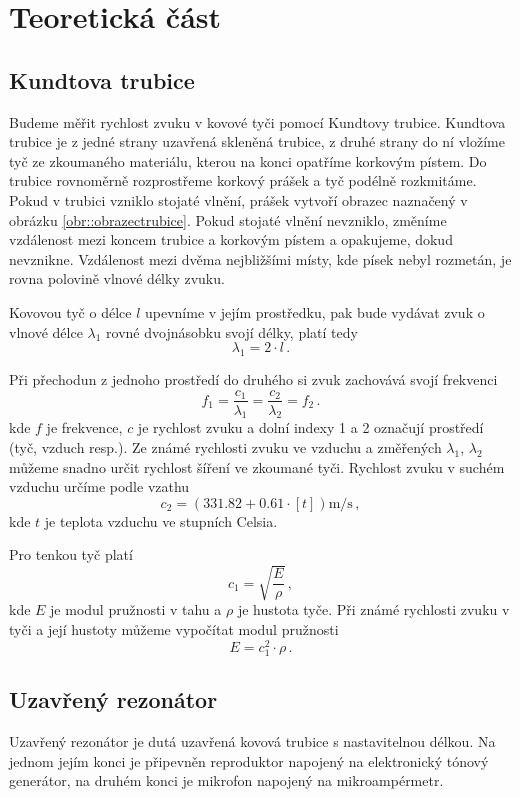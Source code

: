\section*{Teoretická část}
\subsection*{Kundtova trubice}
Budeme měřit rychlost zvuku v kovové tyči pomocí Kundtovy trubice.
Kundtova trubice je z jedné strany uzavřená skleněná trubice, z druhé strany do ní vložíme tyč ze zkoumaného materiálu, kterou na konci opatříme korkovým pístem.
Do trubice rovnoměrně rozprostřeme korkový prášek a tyč podélně rozkmitáme.
Pokud v trubici vzniklo stojaté vlnění, prášek vytvoří obrazec naznačený v obrázku \ref{obr::obrazectrubice}.
Pokud stojaté vlnění nevzniklo, změníme vzdálenost mezi koncem trubice a korkovým pístem a opakujeme, dokud nevznikne.
Vzdálenost mezi dvěma nejbližšími místy, kde písek nebyl rozmetán, je rovna polovině vlnové délky zvuku.


Kovovou tyč o délce $l$ upevníme v jejím prostředku, pak bude vydávat zvuk o vlnové délce $\lambda_1$ rovné dvojnásobku svojí délky, platí tedy
\begin{equation}
\lambda_1=2 \cdot l  \,.
\end{equation}

Při přechodun z jednoho prostředí do druhého si zvuk zachovává svojí frekvenci
\begin{equation}
f_1= \frac{c_1}{\lambda_1}=\frac{c_2}{\lambda_2}=f_2 \,.
\end{equation}
kde $f$ je frekvence, $c$ je rychlost zvuku a dolní indexy 1 a 2 označují prostředí (tyč, vzduch resp.).
Ze známé rychlosti zvuku ve vzduchu a změřených $\lambda_1$, $\lambda_2$ můžeme snadno určit rychlost šíření ve zkoumané tyči.
Rychlost zvuku v suchém vzduchu určíme podle vzathu \cite{ZFP}
\begin{equation}
c_2 =(\num{331.82} + \num{0.61} \cdot [t]) \si{\m\per\s} \,,
\end{equation}
kde $t$ je teplota vzduchu ve stupních Celsia.

Pro tenkou tyč platí \cite{ZFP}
\begin{equation}
c_1 = \sqrt{ \frac{E}{\rho}  } \,,
\end{equation}
kde $E$ je modul pružnosti v tahu a $\rho$ je hustota tyče.
Při známé rychlosti zvuku v tyči a její hustoty můžeme vypočítat modul pružnosti 
\begin{equation}
E=c_1^2 \cdot \rho \,.
\end{equation}


\subsection*{Uzavřený rezonátor}
Uzavřený rezonátor je dutá uzavřená kovová trubice s nastavitelnou délkou.
Na jednom jejím konci je připevněn reproduktor napojený na elektronický tónový generátor, na druhém konci je mikrofon napojený na mikroampérmetr.





